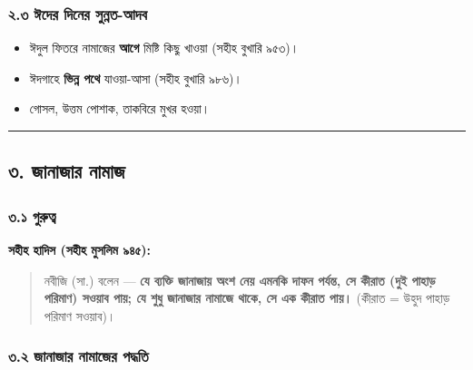 \subsubsection*{২.৩ ঈদের দিনের সুন্নত-আদব}

\begin{itemize}
\item ঈদুল ফিতরে নামাজের \textbf{আগে} মিষ্টি কিছু খাওয়া (সহীহ বুখারি ৯৫৩)।
\item ঈদগাহে \textbf{ভিন্ন পথে} যাওয়া-আসা (সহীহ বুখারি ৯৮৬)।
\item গোসল, উত্তম পোশাক, তাকবিরে মুখর হওয়া।
\end{itemize}
\medskip\hrule\medskip

\subsection*{৩. জানাজার নামাজ}

\subsubsection*{৩.১ গুরুত্ব}

\textbf{সহীহ হাদিস (সহীহ মুসলিম ৯৪৫):}

\begin{quote}
নবীজি (সা.) বলেন — \textbf{যে ব্যক্তি জানাজায় অংশ নেয় এমনকি দাফন পর্যন্ত, সে কীরাত (দুই পাহাড় পরিমাণ) সওয়াব পায়; যে শুধু জানাজার নামাজে থাকে, সে এক কীরাত পায়।} (কীরাত = উহুদ পাহাড় পরিমাণ সওয়াব)।
\end{quote}

\subsubsection*{৩.২ জানাজার নামাজের পদ্ধতি}

